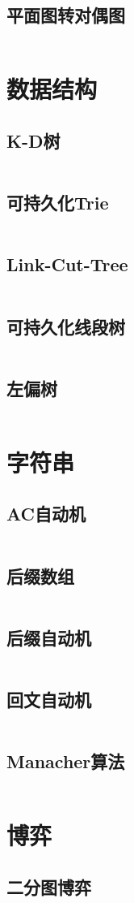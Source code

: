 \documentclass[a4paper]{article}
\newcommand{\cppcode}[1]{
    \inputminted[mathescape,
    			tabsize=2
    			]{cpp}{source/#1}
}
\begin{document}
	\subsection{平面图转对偶图}
		\cppcode{graph/dualgraph.cpp}

\section{数据结构}
	\subsection{K-D树}
		\cppcode{data_structure/KDTree.cpp}

	\subsection{可持久化Trie}
		\cppcode{data_structure/persistant-trie.cpp}

	\subsection{Link-Cut-Tree}
		\cppcode{data_structure/LCT.cpp}

	\subsection{可持久化线段树}
		\cppcode{data_structure/persistant-segtree.cpp}
	
	\subsection{左偏树}
		\cppcode{data_structure/leftist-tree.cpp}

\section{字符串}
	\subsection{AC自动机}
		\cppcode{strings/ACautomaton.cpp}

	\subsection{后缀数组}
		\cppcode{strings/suffixarray.cpp}

	\subsection{后缀自动机}
		\cppcode{strings/SAM.cpp}

	\subsection{回文自动机}
		\cppcode{strings/PAM.cpp}

	\subsection{Manacher算法}
		\cppcode{strings/manacher.cpp}

\section{博弈}
	\subsection{二分图博弈}
		\cppcode{games/bipartite-graph-game.cpp}
\end{document}

